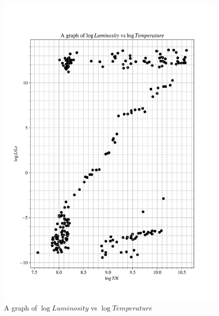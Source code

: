 \documentclass[12pt, a4paper]{article}
\begin{document}
\begin{figure}[H]
    \centering
    \includegraphics[width = \textwidth]{2Plot2.png}
    \caption{A graph of \(\log{Luminosity}\) vs \(\log{Temperature}\)}
    \label{fig:Fig 2.2}
\end{figure}
\end{document}
